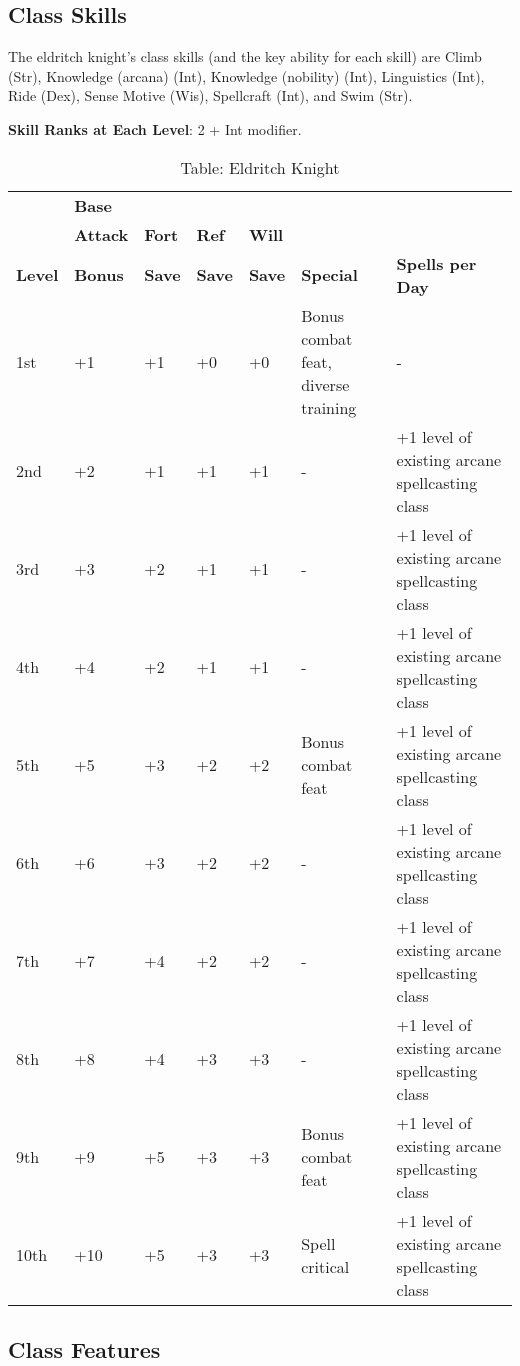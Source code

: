 \subsection{Class Skills}

				
The eldritch knight's class skills (and the key ability for each skill) are Climb (Str), Knowledge (arcana) (Int), Knowledge (nobility) (Int), Linguistics (Int), Ride (Dex), Sense Motive (Wis), Spellcraft (Int), and Swim (Str). 
				
\textbf{ Skill Ranks at Each Level}: 2 + Int modifier.

\begin{table*}[]
\sffamily
\caption{Table: Eldritch Knight}
\begin{tabular}{lllllll}
      & \textbf{Base} & & & & & \\ 
      & \textbf{Attack} & \textbf{Fort} & \textbf{Ref} & \textbf{Will} & & \\
\textbf{Level} & \textbf{Bonus }& \textbf{Save }&\textbf{ Save }& \textbf{Save }& \textbf{Special }& \textbf{Spells per Day}\\
1st & +1 & +1 & +0 & +0 & Bonus combat feat, diverse training & -\\
2nd & +2 & +1 & +1 & +1 & - & +1 level of existing arcane spellcasting class\\
3rd & +3 & +2 & +1 & +1 & - & +1 level of existing arcane spellcasting class\\
4th & +4 & +2 & +1 & +1 & - & +1 level of existing arcane spellcasting class\\
5th & +5 & +3 & +2 & +2 & Bonus combat feat & +1 level of existing arcane spellcasting class\\
6th & +6 & +3 & +2 & +2 & - & +1 level of existing arcane spellcasting class\\
7th & +7 & +4 & +2 & +2 & - & +1 level of existing arcane spellcasting class\\
8th & +8 & +4 & +3 & +3 & - & +1 level of existing arcane spellcasting class\\
9th & +9 & +5 & +3 & +3 & Bonus combat feat & +1 level of existing arcane spellcasting class\\
10th & +10 & +5 & +3 & +3 & Spell critical & +1 level of existing arcane spellcasting class\\
\end{tabular}
\end{table*}
				
\subsection{Class Features}

